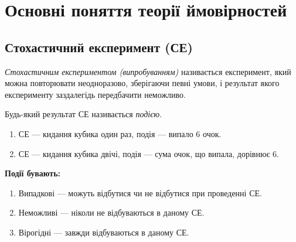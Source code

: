
\section{Основні поняття теорії ймовірностей}
\subsection{Стохастичний експеримент (СЕ)}
\begin{definition}
    \emph{Стохастичним експериментом (випробуванням)} називається експеримент, 
    який можна повторювати неодноразово, зберігаючи певні умови, і результат якого 
    експерименту заздалегідь передбачити неможливо.
\end{definition}
\begin{definition}
    Будь-який результат СЕ називається \emph{подією}.
\end{definition}
\begin{example}
    \begin{enumerate}
        \mbox{}
        \item СЕ --- кидання кубика один раз, подія --- випало 6 очок.
        \item СЕ --- кидання кубика двічі, подія --- сума очок, що випала, дорівнює 6.
    \end{enumerate}
\end{example}

\textbf{Події бувають:}
\begin{enumerate}
    \item Випадкові --- можуть відбутися чи не відбутися при проведенні СЕ.
    \item Неможливі --- ніколи не відбуваються в даному СЕ.
    \item Вірогідні --- завжди відбуваються в даному СЕ.
\end{enumerate}

